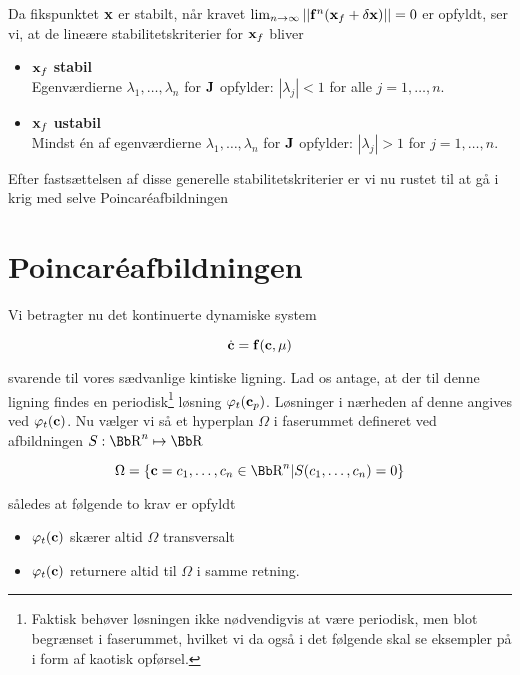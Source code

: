 Da fikspunktet ${\bf x}$ er stabilt, n{\aa}r kravet $\lim_{n
\rightarrow \infty} ||{\bf f}^n({\bf x}_f+\delta{\bf x})||
= 0$ er opfyldt, ser vi, at de line{\ae}re
stabilitetskriterier for ${\bf x}_f$ bliver

\begin{itemize}
 \item ${\bf x}_f$ {\bf stabil}\\
 Egenv{\ae}rdierne $\lambda_1,\ldots,\lambda_n$ for ${\bf J}$ 
 opfylder: $|\lambda_j|<1$ for alle $j = 1,\ldots,n$.
 \item ${\bf x}_f$ {\bf ustabil}\\
 Mindst \'{e}n af egenv{\ae}rdierne $\lambda_1,\ldots,\lambda_n$ 
 for ${\bf J}$ opfylder: $|\lambda_j|>1$ for $j = 1,\ldots,n$.
\end{itemize}

Efter fasts{\ae}ttelsen af disse generelle
stabilitetskriterier er vi nu rustet til at g{\aa} i krig
med selve Poincar\'{e}afbild\-ningen

\section{Poincar\'{e}afbild\-ningen}
Vi betragter nu det kontinuerte dynamiske system

\begin{equation}
 \dot{\bf c} = {\bf f}({\bf c},\mu)
 \label{eq:GenKin2}
\end{equation}

svarende til vores s{\ae}dvanlige kintiske ligning. Lad os
antage, at der til denne ligning findes en
periodisk\footnote{Faktisk beh{\o}ver l{\o}sningen ikke
n{\o}dvendigvis at v{\ae}re periodisk, men blot
begr{\ae}nset i faserummet, hvilket vi da ogs{\aa} i det
f{\o}lgende skal se eksempler p{\aa} i form af kaotisk
opf{\o}rsel.} l{\o}sning $\varphi_t({\bf c}_p)$.
L{\o}sninger i n{\ae}rheden af denne angives ved
$\varphi_t({\bf c})$. Nu v{\ae}lger vi s{\aa} et hyperplan
$\Omega$ i faserummet defineret ved afbild\-ningen $S: \R^n
\mapsto \R$

\begin{equation}
 \Omega = \{{\bf c} = c_1,\ldots,c_n \in \R^n 
 | S(c_1,\ldots,c_n) = 0\}
\end{equation}

s{\aa}ledes at f{\o}lgende to krav er opfyldt

\begin{itemize}
 \item $\varphi_t({\bf c})$ sk{\ae}rer altid $\Omega$ transversalt
 \item $\varphi_t({\bf c})$ returnere altid til $\Omega$ i samme
 retning.
\end{itemize}

